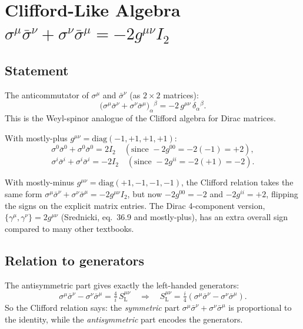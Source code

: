 \section{Clifford-Like Algebra \quad
         \texorpdfstring{$\sigma^\mu\bar\sigma^\nu + \sigma^\nu\bar\sigma^\mu
         = -2g^{\mu\nu}I_2$}{Clifford}}

\subsection{Statement}

The anticommutator of $\sigma^\mu$ and $\bar\sigma^\nu$ (as $2\times2$ matrices):
\begin{equation}
  \bigl(\sigma^\mu\bar\sigma^\nu + \sigma^\nu\bar\sigma^\mu\bigr)_\alpha{}^\beta
  = -2\,g^{\mu\nu}\,\delta_\alpha{}^\beta.
  \tag{35-Clifford}
\end{equation}
This is the Weyl-spinor analogue of the Clifford algebra for Dirac matrices.

With mostly-plus $g^{\mu\nu}=\mathrm{diag}(-1,+1,+1,+1)$:
\[
  \sigma^0\bar\sigma^0 + \sigma^0\bar\sigma^0 = 2I_2
  \quad(\text{since } -2g^{00}=-2(-1)=+2),
\]
\[
  \sigma^i\bar\sigma^i + \sigma^i\bar\sigma^i = -2I_2
  \quad(\text{since } -2g^{ii}=-2(+1)=-2).
\]

\begin{metricnote}
With mostly-minus $g^{\mu\nu}=\mathrm{diag}(+1,-1,-1,-1)$, the Clifford
relation takes the same form $\sigma^\mu\bar\sigma^\nu+\sigma^\nu\bar\sigma^\mu=-2g^{\mu\nu}I_2$,
but now $-2g^{00}=-2$ and $-2g^{ii}=+2$, flipping the signs on the
explicit matrix entries.  The Dirac 4-component version,
$\{\gamma^\mu,\gamma^\nu\}=2g^{\mu\nu}$ (Srednicki, eq.~36.9 and mostly-plus),
has an extra overall sign compared to many other textbooks.
\end{metricnote}

\subsection{Relation to generators}

The antisymmetric part gives exactly the left-handed generators:
\[
  \sigma^\mu\bar\sigma^\nu - \sigma^\nu\bar\sigma^\mu
  = \tfrac{4}{i}\,S^{\mu\nu}_{\mathrm{L}}
  \quad\Longrightarrow\quad
  S^{\mu\nu}_{\mathrm{L}} = \tfrac{i}{4}
  (\sigma^\mu\bar\sigma^\nu - \sigma^\nu\bar\sigma^\mu).
\]
So the Clifford relation says: the \emph{symmetric} part
$\sigma^\mu\bar\sigma^\nu + \sigma^\nu\bar\sigma^\mu$ is proportional to
the identity, while the \emph{antisymmetric} part encodes the generators.

